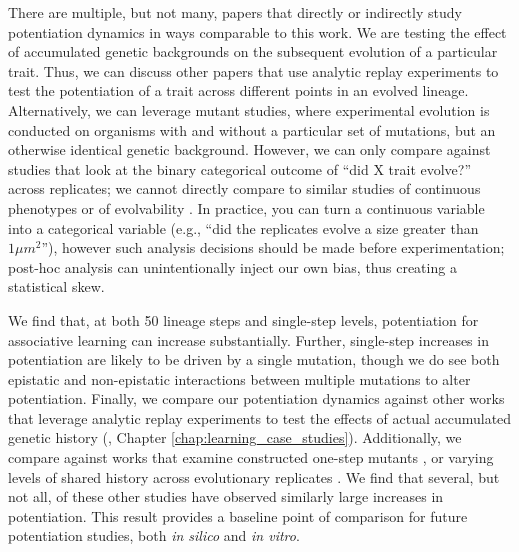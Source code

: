 There are multiple, but not many, papers that directly or indirectly study potentiation dynamics in ways comparable to this work. 
We are testing the effect of accumulated genetic backgrounds on the subsequent evolution of a particular trait. 
Thus, we can discuss other papers that use analytic replay experiments \citep{blountContingencyDeterminismEvolution2018} to test the potentiation of a trait across different points in an evolved lineage. 
Alternatively, we can leverage mutant studies, where experimental evolution is conducted on organisms with and without a particular set of mutations, but an otherwise identical genetic background. 
However, we can only compare against studies that look at the binary categorical outcome of ``did X trait evolve?'' across replicates; we cannot directly compare to similar studies of continuous phenotypes or of evolvability \citep{woodsSecondorderSelectionEvolvability2011, travisanoExperimentalTestsRoles1995, wagenaarInfluenceChanceHistory2004}. 
In practice, you can turn a continuous variable into a categorical variable (e.g., ``did the replicates evolve a size greater than $1\mu m^{2}$''), however such analysis decisions should be made before experimentation; post-hoc analysis can unintentionally inject our own bias, thus creating a statistical skew. 

We find that, at both 50 lineage steps and single-step levels, potentiation for associative learning can increase substantially. 
Further, single-step increases in potentiation are likely to be driven by a single mutation, though we do see both epistatic and non-epistatic interactions between multiple mutations to alter potentiation. 
Finally, we compare our potentiation dynamics against other works that leverage analytic replay experiments to test the effects of actual accumulated genetic history (\citet{blountHistoricalContingencyEvolution2008}, Chapter \ref{chap:learning_case_studies}). 
Additionally, we compare against works that examine constructed one-step mutants \citep{jochumsenEvolutionAntimicrobialPeptide2016a}, or varying levels of shared history across evolutionary replicates \citep{meyerRepeatabilityContingencyEvolution2012}.
We find that several, but not all, of these other studies have observed similarly large increases in potentiation.
This result provides a baseline point of comparison for future potentiation studies, both \textit{in silico} and \textit{in vitro}.
